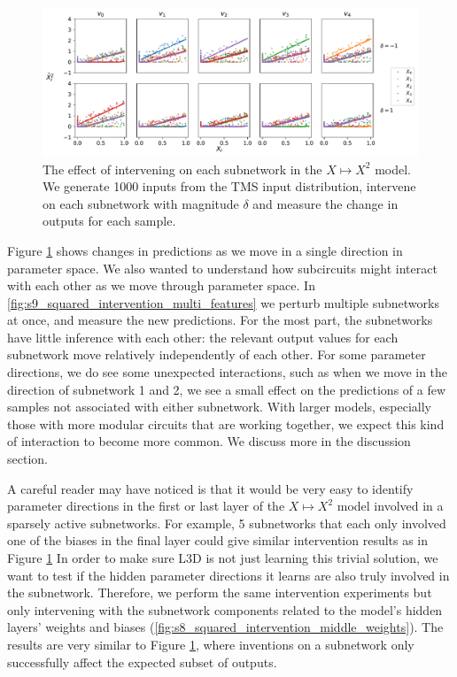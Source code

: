 \documentclass{article}
\theoremstyle{plain}
\theoremstyle{definition}
\theoremstyle{remark}
\begin{document}
\begin{figure}[htbp]
    \centerline{\includegraphics[width=\textwidth]{../figures/9_squared_intervention.pdf}}
    \centering
    \caption{The effect of intervening on each subnetwork in the $X \mapsto X^2$ model. We generate 1000 inputs from the TMS input distribution, intervene on each subnetwork with magnitude $\delta$ and measure the change in outputs for each sample.}\label{fig:9_squared_intervention}
\end{figure}

Figure \ref{fig:9_squared_intervention} shows changes in predictions as we move in a single direction in parameter space. We also wanted to understand how subcircuits might interact with each other as we move through parameter space. In \ref{fig:s9_squared_intervention_multi_features} we perturb multiple subnetworks at once, and measure the new predictions. For the most part, the subnetworks have little inference with each other: the relevant output values for each subnetwork move relatively independently of each other. For some parameter directions, we do see some unexpected interactions, such as when we move in the direction of subnetwork 1 and 2, we see a small effect on the predictions of a few samples not associated with either subnetwork. With larger models, especially those with more modular circuits that are working together, we expect this kind of interaction to become more common. We discuss more in the discussion section. 

A careful reader may have noticed is that it would be very easy to identify parameter directions in the first or last layer of the $X \mapsto X^2$ model involved in a sparsely active subnetworks. For example, 5 subnetworks that each only involved one of the biases in the final layer could give similar intervention results as in Figure \ref{fig:9_squared_intervention} In order to make sure L3D is not just learning this trivial solution, we want to test if the hidden parameter directions it learns are also truly involved in the subnetwork. Therefore, we perform the same intervention experiments but only intervening with the subnetwork components related to the model's hidden layers' weights and biases (\ref{fig:s8_squared_intervention_middle_weights}). The results are very similar to  Figure \ref{fig:9_squared_intervention}, where inventions on a subnetwork only successfully affect the expected subset of outputs. 
\end{document}
